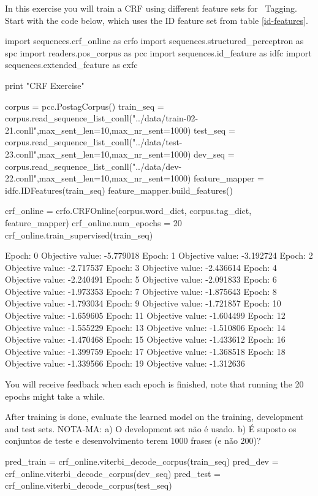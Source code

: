 \begin{exercise}\label{exer:crf1}
In this exercise you will train a CRF
using different feature sets for \pos\ Tagging. Start with the code below, which uses the ID feature set from table \ref{id-features}.
\begin{python}
import sequences.crf_online as crfo
import sequences.structured_perceptron as spc
import readers.pos_corpus as pcc
import sequences.id_feature as idfc
import sequences.extended_feature as exfc

print "CRF Exercise"

corpus = pcc.PostagCorpus()
train_seq = corpus.read_sequence_list_conll("../data/train-02-21.conll",max_sent_len=10,max_nr_sent=1000)
test_seq = corpus.read_sequence_list_conll("../data/test-23.conll",max_sent_len=10,max_nr_sent=1000)
dev_seq = corpus.read_sequence_list_conll("../data/dev-22.conll",max_sent_len=10,max_nr_sent=1000)
feature_mapper = idfc.IDFeatures(train_seq)
feature_mapper.build_features()

crf_online = crfo.CRFOnline(corpus.word_dict, corpus.tag_dict, feature_mapper)
crf_online.num_epochs = 20
crf_online.train_supervised(train_seq)

Epoch: 0 Objective value: -5.779018
Epoch: 1 Objective value: -3.192724
Epoch: 2 Objective value: -2.717537
Epoch: 3 Objective value: -2.436614
Epoch: 4 Objective value: -2.240491
Epoch: 5 Objective value: -2.091833
Epoch: 6 Objective value: -1.973353
Epoch: 7 Objective value: -1.875643
Epoch: 8 Objective value: -1.793034
Epoch: 9 Objective value: -1.721857
Epoch: 10 Objective value: -1.659605
Epoch: 11 Objective value: -1.604499
Epoch: 12 Objective value: -1.555229
Epoch: 13 Objective value: -1.510806
Epoch: 14 Objective value: -1.470468
Epoch: 15 Objective value: -1.433612
Epoch: 16 Objective value: -1.399759
Epoch: 17 Objective value: -1.368518
Epoch: 18 Objective value: -1.339566
Epoch: 19 Objective value: -1.312636
\end{python}

You will receive feedback when each epoch is finished, note that
running the 20 epochs might take a while.

After training is done, evaluate the learned model on the training, development and test sets.
NOTA-MA: a) O development set não é usado. b) É suposto os conjuntos de teste e desenvolvimento terem 1000 frases (e não 200)?
	
\begin{python}
pred_train = crf_online.viterbi_decode_corpus(train_seq)
pred_dev = crf_online.viterbi_decode_corpus(dev_seq)
pred_test = crf_online.viterbi_decode_corpus(test_seq)


\end{python}
\end{exercise}

